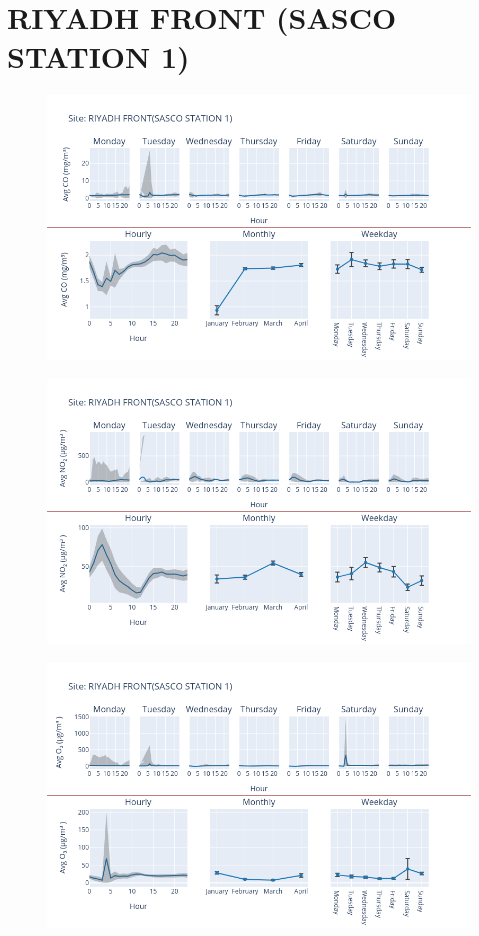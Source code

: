 \documentclass[12pt, oneside]{book}
\begin{document}
{\section{RIYADH FRONT (SASCO STATION 1)}
{\begin{figure}[H] 
 \centering 
\includegraphics[width=.88\textwidth, keepaspectratio]{image122} 
 \end{figure}}{} 

{\begin{figure}[H] 
 \centering 
\includegraphics[width=.88\textwidth, keepaspectratio]{image123} 
 \end{figure}}{} 

{\begin{figure}[H] 
 \centering 
\includegraphics[width=.88\textwidth, keepaspectratio]{image124} 
 \end{figure}}{} 

}
\end{document}
